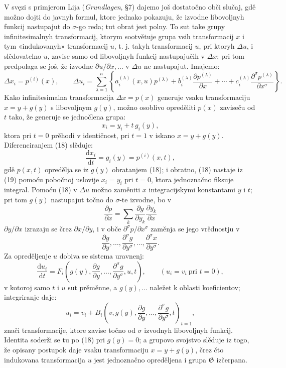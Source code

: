 \documentclass[11pt]{article}
\providecommand{\G}{\mathfrak G}
\providecommand{\D}{\Delta}
\providecommand{\p}{\partial}
\providecommand{\dd}{\mathrm d}
\begin{document}
V svęzi s primjerom Lija (\emph{Grundlagen}, \S{}7) dajemo još dostatočno obči slučaj, gdě možno dojti do javnyh formul, ktore jednako pokazuju, že izvodne libovoljnyh funkcij nastupajut do \(\sigma\)-go reda; tut obrat jest polny. To sut take grupy infinitesimalnyh transformacij, ktorym sootvětuje grupa vsih transformacij \(x\) i tym «indukovanyh» transformacij \(u\), t. j. takyh transformacij \(u\), pri ktoryh \(\D u\), i slědovatelno \(u\), zavise samo od libovoljnyh funkcij nastupajučih v \(\D x\); pri tom predpolaga se još, že izvodne \(\p u/\p x,\ldots\) v \(\D u\) ne nastupajut. Imajemo:
\[
\D x_i=p^{(i)}(x),\qquad
\D u_i=
\sum_{\lambda=1}^{n}\left\{
a_i^{(\lambda)}(x,u)p^{(\lambda)}
+b_i^{(\lambda)}\frac{\p p^{(\lambda)}}{\p x}
+\cdots+
c_i^{(\lambda)}\frac{\p^\sigma p^{(\lambda)}}{\p x^\sigma}
\right\}.
\]
Kako infinitesimalna transformacija \(\D x=p(x)\) generuje vsaku transformaciju \(x=y+g(y)\) s libovoljnym \(g(y)\), možno osoblivo opreděliti \(p(x)\) zaviseču od \(t\) tako, že generuje se jednočlena grupa:
\begin{equation}
x_i=y_i+t\,g_i(y),
\tag{18}
\end{equation}
ktora pri \(t=0\) prěhodi v identičnost, pri \(t=1\) v iskano \(x=y+g(y)\). Diferenciranjem (18) slěduje:
\begin{equation}
\frac{\dd x_i}{\dd t}=g_i(y)=p^{(i)}(x,t),
\tag{19}
\end{equation}
gdě \(p(x,t)\) opredělja se iz \(g(y)\) obratanjem (18); i obratno, (18) nastaje iz (19) pomoću pobočnoj uslovije \(x_i=y_i\) pri \(t=0\), ktora jednoznačno fiksuje integral. Pomoću (18) v \(\D u\) možno zaměniti \(x\) integracijskymi konstantami \(y\) i \(t\); pri tom \(g(y)\) nastupajut točno do \(\sigma\)-te izvodne, bo v
\[
\frac{\p p}{\p x}=\sum_k\frac{\p g}{\p y_k}\frac{\p y_k}{\p x}
\]
\(\p y/\p x\) izrazaju se črez \(\p x/\p y\), i v obče \(\p^\sigma p/\p x^\sigma\) zaměnja se jego vrědnostju v
\[
\frac{\p g}{\p y},\ldots,\frac{\p^\sigma g}{\p y^\sigma},\ldots,\frac{\p^\sigma x}{\p y^\sigma}.
\]
Za opreděljenje \(u\) dobiva se sistema uravnenj:
\[
\frac{\dd u_i}{\dd t}
=
F_i\!\left(g(y),\frac{\p g}{\p y},\ldots,\frac{\p^\sigma g}{\p y^\sigma},u,t\right),
\qquad (u_i=v_i\ \text{pri }t=0),
\]
v kotoroj samo \(t\) i \(u\) sut prěměnne, a \(g(y),\ldots\) naležet k oblasti koeficientov; integriranje daje:
\[
u_i=v_i+
B_i\!\left(v,g(y),\frac{\p g}{\p y},\ldots,\frac{\p^\sigma g}{\p y^\sigma},t\right)_{t=1},
\]
znači transformacije, ktore zavise točno od \(\sigma\) izvodnyh libovoljnyh funkcij. Identita soderži se tu po (18) pri \(g(y)=0\); a grupovo svojstvo slěduje iz togo, že opisany postupok daje vsaku transformaciju \(x=y+g(y)\), črez čto indukovana transformacija \(u\) jest jednoznačno opreděljena i grupa \(\G\) izčerpana.
\end{document}
